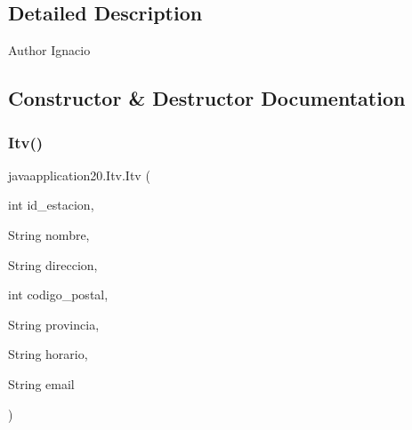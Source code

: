\subsection{Detailed Description}
\begin{DoxyAuthor}{Author}
Ignacio 
\end{DoxyAuthor}


\subsection{Constructor \& Destructor Documentation}
\mbox{\label{classjavaapplication20_1_1_itv_aec26c068fcac7f03411d42f4ccf7d4f9}} 
\subsubsection{\texorpdfstring{Itv()}{Itv()}}
{\footnotesize\ttfamily javaapplication20.\+Itv.\+Itv (\begin{DoxyParamCaption}\item[{int}]{id\+\_\+estacion,  }\item[{String}]{nombre,  }\item[{String}]{direccion,  }\item[{int}]{codigo\+\_\+postal,  }\item[{String}]{provincia,  }\item[{String}]{horario,  }\item[{String}]{email }\end{DoxyParamCaption})\hspace{0.3cm}{\ttfamily [inline]}}


